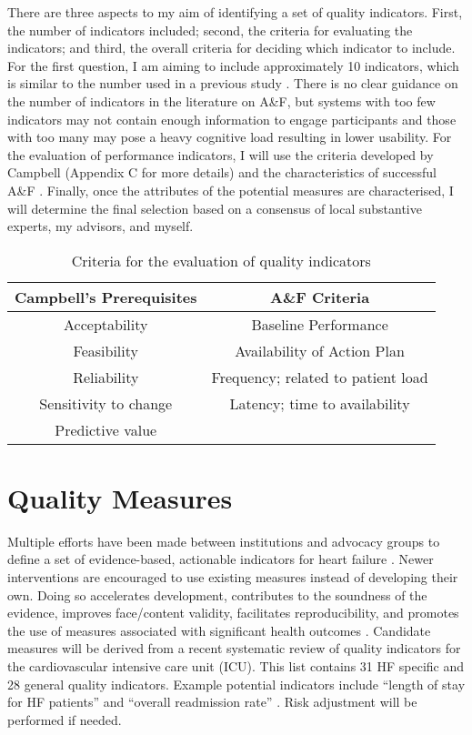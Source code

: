 There are three aspects to my aim of identifying a set of quality indicators. First, the number of indicators included; second, the criteria for evaluating the indicators; and third, the overall criteria for deciding which indicator to include. For the first question, I am aiming to include approximately 10 indicators, which is similar to the number used in a previous study \cite{matthews2007impact}. There is no clear guidance on the number of indicators in the literature on A\&F, but systems with too few indicators may not contain enough information to engage participants and those with too many may pose a heavy cognitive load resulting in lower usability. For the evaluation of performance indicators, I will use the criteria developed by Campbell (Appendix C for more details)  \cite{campbell2002research} and the characteristics of successful A\&F \cite{ivers2012audit}. Finally, once the attributes of the potential measures are characterised, I will determine the final selection based on a consensus of local substantive experts, my advisors, and myself.

\begin{table}[h!]
\centering
\vspace{-2mm}
\begin{tabular}{c|c}
     \textbf{Campbell's Prerequisites} & \textbf{A\&F Criteria}  \\ 
     \hline
     Acceptability         & Baseline Performance  \\  
     Feasibility           & Availability of Action Plan \\
     Reliability           & Frequency; related to patient load \\
     Sensitivity to change & Latency; time to availability \\
     Predictive value   &  \\
\end{tabular}
\caption{Criteria for the evaluation of quality indicators}
\vspace{-5mm}
\end{table}

\section{Quality Measures}
Multiple efforts have been made between institutions and advocacy groups to define a set of evidence-based, actionable indicators for heart failure \cite{hong2006overview, fonarow2010improving, kelley2006health}. Newer interventions are encouraged to use existing measures instead of developing their own. Doing so accelerates development, contributes to the soundness of the evidence, improves face/content validity, facilitates reproducibility, and promotes the use of measures associated with significant health outcomes \cite{smith2009performance}. 
Candidate measures will be derived from a recent systematic review of quality indicators for the cardiovascular intensive care unit (\gls{ICU}). This list contains 31 \gls{HF} specific and 28 general quality indicators. Example potential indicators include ``length of stay for HF patients'' and ``overall readmission rate'' \cite{goldfarb2018systematic}. Risk adjustment will be performed if needed.

